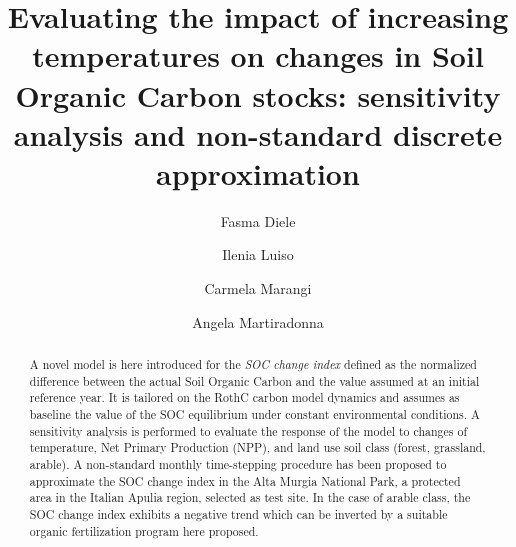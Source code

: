 %


\title{Evaluating the impact of increasing temperatures on changes in Soil Organic Carbon stocks: sensitivity analysis and non-standard discrete approximation %
}


\author{Fasma Diele \and
    Ilenia Luiso \and Carmela Marangi \and    Angela Martiradonna
}





\maketitle

\begin{abstract}
A novel model is here introduced for the {\it SOC change index} defined   as the normalized  difference between the actual Soil Organic Carbon  and the value assumed at an initial reference year. It is tailored on the RothC carbon model dynamics and assumes as baseline the value of the  SOC equilibrium  under  constant environmental conditions.  A sensitivity analysis is performed to evaluate the response of the model to changes of  temperature, Net Primary Production (NPP), and land use soil class (forest, grassland, arable). A non-standard monthly time-stepping procedure has been proposed to approximate the SOC change index in the Alta Murgia National Park, a protected area in the Italian Apulia region, selected  as test site. In the case of arable class, the SOC change index  exhibits a negative trend which can be inverted by a suitable organic fertilization program here proposed. 
\end{abstract}

